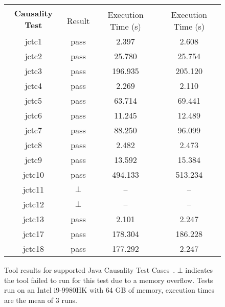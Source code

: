 \begin{figure}[t]
\begin{center}
  \begin{tabularx}{0.7\textwidth}{c||c|c|c}
    \multirow{2}{*}{\bf Causality Test}   & \multicolumn{2}{c|}{\PwTc{}}    & \PwT{}\\
    \cline{2-4}
                                     & Result & Execution Time (s)  & Execution Time (s) \\
    \cline{1-4}
    jctc1                            & pass   & 2.397               & 2.608              \\
    jctc2                            & pass   & 25.780              & 25.754             \\
    jctc3                            & pass   & 196.935             & 205.120            \\
    jctc4                            & pass   & 2.269               & 2.110              \\
    jctc5                            & pass   & 63.714              & 69.441             \\
    jctc6                            & pass   & 11.245              & 12.489             \\
    jctc7                            & pass   & 88.250              & 96.099             \\
    jctc8                            & pass   & 2.482               & 2.473              \\
    jctc9                            & pass   & 13.592              & 15.384             \\
    jctc10                           & pass   & 494.133             & 513.234            \\
    jctc11                           & $\bot$ & --                  & --                 \\
    jctc12                           & $\bot$ & --                  & --                 \\
    jctc13                           & pass   & 2.101               & 2.247              \\
    jctc17                           & pass   & 178.304             & 186.228            \\
    jctc18                           & pass   & 177.292             & 2.247              \\
  \end{tabularx}
  \caption{\label{fig:tool} Tool results for supported Java Causality Test Cases~\cite{PughWebsite}. $\bot$ indicates the tool failed to run for this test due to a memory overflow. Tests run on an Intel i9-9980HK with 64 GB of memory, execution times are the mean of 3 runs.}
\end{center}
\end{figure}

